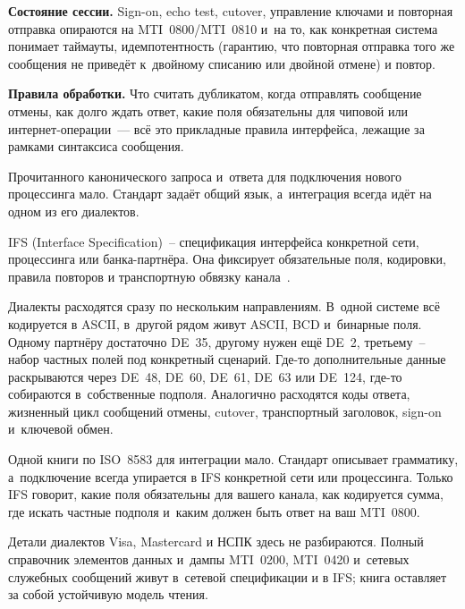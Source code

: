\textbf{Состояние сессии.} Sign-on, echo test, cutover, управление ключами и повторная отправка опираются на MTI~0800/MTI~0810 и~на то, как конкретная система понимает таймауты, идемпотентность (гарантию, что повторная отправка того же сообщения не приведёт к~двойному списанию или двойной отмене) и повтор.

\textbf{Правила обработки.} Что считать дубликатом, когда отправлять сообщение отмены, как долго ждать ответ, какие поля обязательны для чиповой или интернет-операции~--- всё это прикладные правила интерфейса, лежащие за рамками синтаксиса сообщения.

Прочитанного канонического запроса и~ответа для подключения нового процессинга мало. Стандарт задаёт общий язык, а~интеграция всегда идёт на одном из его диалектов.

IFS (Interface Specification)~-- спецификация интерфейса конкретной сети, процессинга или банка-партнёра. Она фиксирует обязательные поля, кодировки, правила повторов и транспортную обвязку канала~\cite{fis-iso8583-guide-2023}.

Диалекты расходятся сразу по нескольким направлениям. В~одной системе всё кодируется в ASCII, в~другой рядом живут ASCII, BCD и~бинарные поля. Одному партнёру достаточно DE~35, другому нужен ещё DE~2, третьему~-- набор частных полей под конкретный сценарий. Где-то дополнительные данные раскрываются через DE~48, DE~60, DE~61, DE~63 или DE~124, где-то собираются в~собственные подполя. Аналогично расходятся коды ответа, жизненный цикл сообщений отмены, cutover, транспортный заголовок, sign-on и~ключевой обмен.

Одной книги по ISO~8583 для интеграции мало. Стандарт описывает грамматику, а~подключение всегда упирается в IFS конкретной сети или процессинга. Только IFS говорит, какие поля обязательны для вашего канала, как кодируется сумма, где искать частные подполя и~каким должен быть ответ на ваш MTI~0800.

Детали диалектов Visa, Mastercard и НСПК здесь не разбираются. Полный справочник элементов данных и~дампы MTI~0200, MTI~0420 и~сетевых служебных сообщений живут в~сетевой спецификации и в IFS; книга оставляет за собой устойчивую модель чтения.
